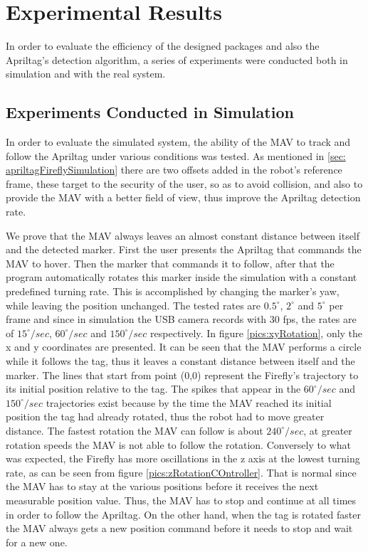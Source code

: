 \chapter{Experimental Results}
\label{sec:ExperimentalResults}

In order to evaluate the efficiency of the designed packages and also the Apriltag's detection algorithm, a series of experiments were conducted both in simulation and with the real system.

\section{Experiments Conducted in Simulation}
\label{sec:simulatedExperiments}

In order to evaluate the simulated system, the ability of the MAV to track and follow the Apriltag under various conditions was tested. As mentioned in \ref{sec: apriltagFireflySimulation} there are two offsets added in the robot's reference frame, these target to the security of the user, so as to avoid collision, and also to provide the MAV with a better field of view, thus improve the Apriltag detection rate.   

We prove that the MAV always leaves an almost constant distance between itself and the detected marker. First the user presents the Apriltag that commands the MAV to hover. Then the marker that commands it to follow, after that the program automatically rotates this marker inside the simulation with a constant predefined turning rate. This is accomplished by changing the marker's yaw, while leaving the position unchanged. The tested rates are $0.5^{\circ}$, $2^{\circ}$ and $5^{\circ}$ per frame and since in simulation the USB camera records with 30 fps, the rates are of $15^{\circ}/sec$, $60^{\circ}/sec$ and $150^{\circ}/sec$ respectively. In figure \ref{pics:xyRotation}, only the x and y coordinates are presented. It can be seen that the MAV performs a circle while it follows the tag, thus it leaves a constant distance between itself and the marker. The lines that start from point (0,0) represent the Firefly's trajectory to its initial position relative to the tag. The spikes that appear in the $60^{\circ}/sec$ and $150^{\circ}/sec$ trajectories exist because by the time the MAV reached its initial position the tag had already rotated, thus the robot had to move greater distance. The fastest rotation the MAV can follow is about $240^{\circ}/sec$, at greater rotation speeds the MAV is not able to follow the rotation. Conversely to what was expected, the Firefly has more oscillations in the z axis at the lowest turning rate, as can be seen from figure \ref{pics:zRotationCOntroller}. That is normal since the MAV has to stay at the various positions before it receives the next measurable position value. Thus, the MAV has to stop and continue at all times in order to follow the Apriltag. On the other hand, when the tag is rotated faster the MAV always gets a new position command before it needs to stop and wait for a new one.

